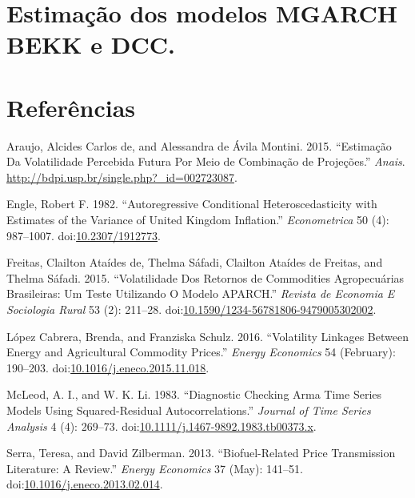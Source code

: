 \documentclass[]{article}
\begin{document}
\section{Estimação dos modelos MGARCH BEKK e
DCC.}\label{estimacao-dos-modelos-mgarch-bekk-e-dcc.}

\pagebreak

\section*{Referências}\label{referencias}

\setlength{\parindent}{0in}

\hypertarget{refs}{}
\hypertarget{ref-araujo_estimacao_2015}{}
Araujo, Alcides Carlos de, and Alessandra de Ávila Montini. 2015.
``Estimação Da Volatilidade Percebida Futura Por Meio de Combinação de
Projeções.'' \emph{Anais}.
\url{http://bdpi.usp.br/single.php?_id=002723087}.

\hypertarget{ref-engle_autoregressive_1982}{}
Engle, Robert F. 1982. ``Autoregressive Conditional Heteroscedasticity
with Estimates of the Variance of United Kingdom Inflation.''
\emph{Econometrica} 50 (4): 987--1007.
doi:\href{https://doi.org/10.2307/1912773}{10.2307/1912773}.

\hypertarget{ref-freitas_volatilidade_2015}{}
Freitas, Clailton Ataídes de, Thelma Sáfadi, Clailton Ataídes de
Freitas, and Thelma Sáfadi. 2015. ``Volatilidade Dos Retornos de
Commodities Agropecuárias Brasileiras: Um Teste Utilizando O Modelo
APARCH.'' \emph{Revista de Economia E Sociologia Rural} 53 (2): 211--28.
doi:\href{https://doi.org/10.1590/1234-56781806-9479005302002}{10.1590/1234-56781806-9479005302002}.

\hypertarget{ref-lopez_cabrera_volatility_2016}{}
López Cabrera, Brenda, and Franziska Schulz. 2016. ``Volatility Linkages
Between Energy and Agricultural Commodity Prices.'' \emph{Energy
Economics} 54 (February): 190--203.
doi:\href{https://doi.org/10.1016/j.eneco.2015.11.018}{10.1016/j.eneco.2015.11.018}.

\hypertarget{ref-mcleod_diagnostic_1983}{}
McLeod, A. I., and W. K. Li. 1983. ``Diagnostic Checking Arma Time
Series Models Using Squared-Residual Autocorrelations.'' \emph{Journal
of Time Series Analysis} 4 (4): 269--73.
doi:\href{https://doi.org/10.1111/j.1467-9892.1983.tb00373.x}{10.1111/j.1467-9892.1983.tb00373.x}.

\hypertarget{ref-serra_biofuel-related_2013}{}
Serra, Teresa, and David Zilberman. 2013. ``Biofuel-Related Price
Transmission Literature: A Review.'' \emph{Energy Economics} 37 (May):
141--51.
doi:\href{https://doi.org/10.1016/j.eneco.2013.02.014}{10.1016/j.eneco.2013.02.014}.
\end{document}
